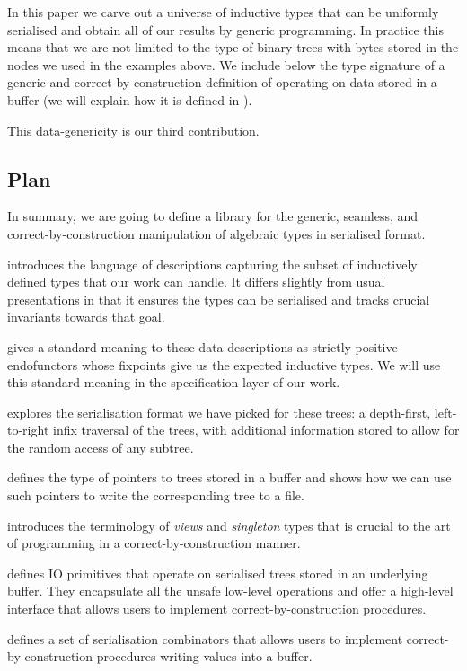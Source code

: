 In this paper we carve out a universe of inductive types that can be
uniformly serialised and obtain all of our results by generic programming.
%
In practice this means that we are not limited to the type of binary trees
with bytes stored in the nodes we used in the examples above.
%
We include below the type signature of a generic and correct-by-construction
definition of  operating on data stored in a buffer
(we will explain how it is defined in ).


This data-genericity is our third contribution.

\subsection{Plan}

In summary, we are going to define a library for the
generic,
seamless,
and correct-by-construction
manipulation of algebraic types in serialised format.


 introduces the language of descriptions capturing the
subset of inductively defined types that our work can handle.
It differs slightly from usual presentations in that it ensures the
types can be serialised and tracks crucial invariants towards that goal.

 gives a standard meaning to these data descriptions
as strictly positive endofunctors whose fixpoints give us the expected
inductive types.
%
We will use this standard meaning in the specification layer of our work.

 explores the serialisation format we have picked
for these trees: a depth-first, left-to-right infix traversal of the
trees, with additional information stored to allow for the random access
of any subtree.

 defines the type of pointers to trees stored in a
buffer and shows how we can use such pointers to write the corresponding
tree to a file.

 introduces the terminology of \emph{views} and
\emph{singleton} types that is crucial to the art of programming
in a correct-by-construction manner.

 defines IO primitives that operate on serialised
trees stored in an underlying buffer.
%
They encapsulate all the unsafe low-level operations and offer a
high-level interface that allows users to implement correct-by-construction
procedures.

 defines a set of serialisation combinators that
allows users to implement correct-by-construction procedures writing
values into a buffer.

